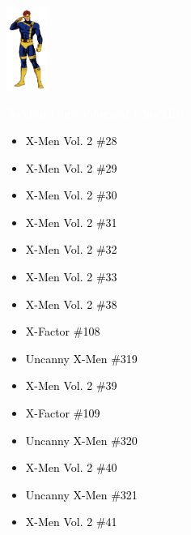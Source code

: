 \documentclass[12pt]{article}
\newcommand{\checkbox}{\raisebox{0.0ex}{\fbox{\rule{0ex}{1.5ex} \rule{1.5ex}{0ex}}}}
\begin{document}
\begin{center}
    \vspace*{2cm}
    \includegraphics[width=0.1\textwidth]{cyclops.png}
    \vspace{0.3cm}

    {\Huge \textbf{\textcolor{white}{X-Men Chronological Checklist}}}
\end{center}

\vspace{0.3cm}
\noindent
\begin{tcolorbox}[
  colback=white!95!gray,
  colframe=black,
  width=\textwidth,
  arc=4mm,
  auto outer arc,
  boxrule=0.8pt,
  left=8pt,right=8pt,top=8pt,bottom=8pt
]
\begin{itemize}[left=0pt,label={\checkbox}]
    \item \textcolor{black}{X-Men Vol. 2 \#28}
    \item \textcolor{black}{X-Men Vol. 2 \#29}
    \item \textcolor{black}{X-Men Vol. 2 \#30}
    \item \textcolor{black}{X-Men Vol. 2 \#31}
    \item \textcolor{black}{X-Men Vol. 2 \#32}
    \item \textcolor{black}{X-Men Vol. 2 \#33}
    \item \textcolor{black}{X-Men Vol. 2 \#38}
    \item \textcolor{black}{X-Factor \#108}
    \item \textcolor{black}{Uncanny X-Men \#319}
    \item \textcolor{black}{X-Men Vol. 2 \#39}
    \item \textcolor{black}{X-Factor \#109}
    \item \textcolor{black}{Uncanny X-Men \#320}
    \item \textcolor{black}{X-Men Vol. 2 \#40}
    \item \textcolor{black}{Uncanny X-Men \#321}
    \item \textcolor{black}{X-Men Vol. 2 \#41}
\end{itemize}
\end{tcolorbox}
\end{document}
